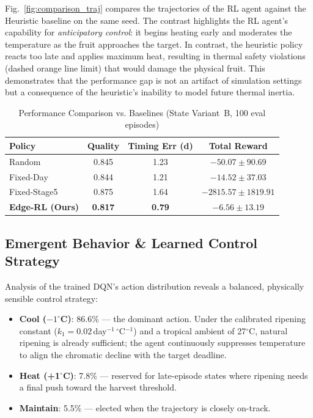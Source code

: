 \documentclass[conference]{IEEEtran}
\begin{document}
    Fig.~\ref{fig:comparison_traj} compares the trajectories of the RL agent against the Heuristic baseline on the same seed. The contrast highlights the RL agent's capability for \textit{anticipatory control}: it begins heating early and moderates the temperature as the fruit approaches the target. In contrast, the heuristic policy reacts too late and applies maximum heat, resulting in thermal safety violations (dashed orange line limit) that would damage the physical fruit. This demonstrates that the performance gap is not an artifact of simulation settings but a consequence of the heuristic's inability to model future thermal inertia.

    \begin{table}[htbp]
    \caption{Performance Comparison vs. Baselines (State Variant~B, 100 eval episodes)}
    \label{tab:baseline_comparison}
    \centering
    \begin{tabular}{@{}lccc@{}}
    \toprule
    \textbf{Policy} & \textbf{Quality} & \textbf{Timing Err (d)} & \textbf{Total Reward} \\
    \midrule
    Random & 0.845 & 1.23 & $-50.07 \pm 90.69$ \\
    Fixed-Day & 0.844 & 1.21 & $-14.52 \pm 37.03$ \\
    Fixed-Stage5 & 0.875 & 1.64 & $-2815.57 \pm 1819.91$ \\
    \textbf{Edge-RL (Ours)} & \textbf{0.817} & \textbf{0.79} & $\mathbf{-6.56 \pm 13.19}$ \\
    \bottomrule
    \end{tabular}
    \end{table}

    \subsection{Emergent Behavior \& Learned Control Strategy}

    Analysis of the trained DQN's action distribution reveals a balanced, physically sensible control strategy:

    \begin{itemize}
        \item \textbf{Cool ($-1^\circ$C)}: 86.6\% --- the dominant action. Under the calibrated ripening constant ($k_1=0.02$\,day$^{-1}\,^\circ$C$^{-1}$) and a tropical ambient of 27$^\circ$C, natural ripening is already sufficient; the agent continuously suppresses temperature to align the chromatic decline with the target deadline.
        \item \textbf{Heat (+1$^\circ$C)}: 7.8\% --- reserved for late-episode states where ripening needs a final push toward the harvest threshold.
        \item \textbf{Maintain}: 5.5\% --- elected when the trajectory is closely on-track.
    \end{itemize}
\end{document}
